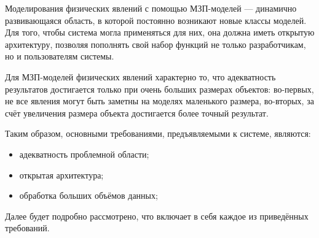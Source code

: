 \documentclass[a4paper,12pt]{extarticle}
\begin{document}
Моделирования физических явлений с помощью МЗП-моделей --- динамично развивающаяся область, в которой постоянно возникают новые классы моделей. Для того, чтобы система могла применяться для них, она должна иметь открытую архитектуру, позволяя пополнять свой набор функций не только разработчикам, но и пользователям системы. 

Для МЗП-моделей физических явлений характерно то, что адекватность результатов достигается только при очень больших размерах объектов: во-первых, не все явления могут быть заметны на моделях маленького размера, во-вторых, за счёт увеличения размера объекта достигается более точный результат.

Таким образом, основными требованиями, предъявляемыми к системе, являются:
\begin{itemize}
    \item адекватность проблемной области;
    \item открытая архитектура;
    \item обработка больших объёмов данных;
\end{itemize}

Далее будет подробно рассмотрено, что включает в себя каждое из приведённых требований.
\end{document}
